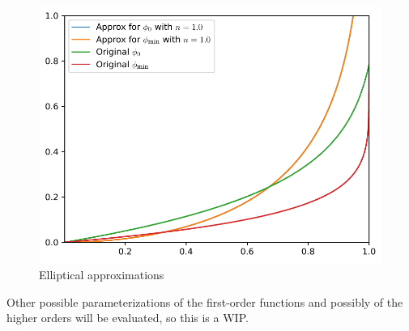 \begin{figure}[H]
    \centering
    \includegraphics[scale=0.75]{plots/elliptical-approx.pdf}
    \caption{Elliptical approximations}
\end{figure}

Other possible parameterizations of the first-order functions and possibly of the higher orders will be evaluated, so this is a WIP.
